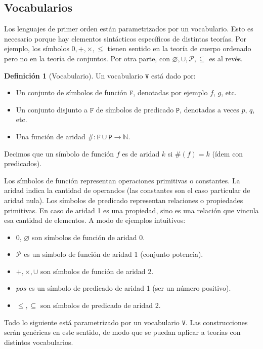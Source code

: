 \documentclass[a4paper, 12pt]{report}
\newcommand{\N}{\mathbb{N}}
\theoremstyle{definition}
\newtheorem{definicion}[teorema]{Definición}
\begin{document}
\subsection{Vocabularios}

Los lenguajes de primer orden están parametrizados por un vocabulario. Esto es necesario porque hay elementos sintácticos específicos de distintas teorías. Por ejemplo, los símbolos $0,+,\times,\leq$ tienen sentido en la teoría de cuerpo ordenado pero no en la teoría de conjuntos. Por otra parte, con $\varnothing,\cup,\mathcal{P},\subseteq$ es al revés.

\begin{definicion}[Vocabulario]
	Un vocabulario $\mathtt{V}$ está dado por:
	\begin{itemize}
		\item Un conjunto de símbolos de función $\mathtt{F}$, denotadas por ejemplo $f$, $g$, etc.
		\item Un conjunto disjunto a $\mathtt{F}$ de símbolos de predicado $\mathtt{P}$, denotadas a veces $p$, $q$, etc.
		\item Una función de aridad $\#:\mathtt{F}\cup\mathtt{P}\to\N$.
	\end{itemize}
	Decimos que un símbolo de función $f$ es de aridad $k$ si $\#(f)=k$ (ídem con predicados).
\end{definicion}
Los símbolos de función representan operaciones primitivas o constantes. La aridad indica la cantidad de operandos (las constantes son el caso particular de aridad nula). Los símbolos de predicado representan relaciones o propiedades primitivas. En caso de aridad 1 es una propiedad, sino es una relación que vincula esa cantidad de elementos. A modo de ejemplos intuitivos:
\begin{itemize}
	\item $0$, $\varnothing$ son símbolos de función de aridad 0.
	\item $\mathcal{P}$ es un símbolo de función de aridad 1 (conjunto potencia).
	\item $+,\times,\cup$ son símbolos de función de aridad 2.
	\item $pos$ es un símbolo de predicado de aridad 1 (ser un número positivo).
	\item $\leq,\subseteq$ son símbolos de predicado de aridad 2.
\end{itemize}
Todo lo siguiente está parametrizado por un vocabulario $\mathtt{V}$. Las construcciones serán genéricas en este sentido, de modo que se puedan aplicar a teorías con distintos vocabularios.
\end{document}
